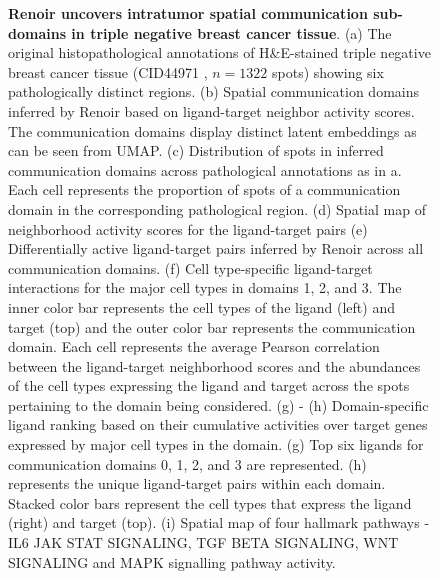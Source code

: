 \begin{figure}[H]
    \centering
    \caption{\textbf{Renoir uncovers intratumor spatial communication sub-domains in triple negative breast cancer tissue}. (a) The original histopathological annotations of H\&E-stained triple negative breast cancer tissue (CID44971 \citep{Wu2021}, $n=1322$ spots) showing six pathologically distinct regions. (b) Spatial communication domains inferred by Renoir based on ligand-target neighbor activity scores. The communication domains display distinct latent embeddings as can be seen from UMAP. (c) Distribution of spots in inferred communication domains across pathological annotations as in a. Each cell represents the proportion of spots of a communication domain in the corresponding pathological region. (d) Spatial map of neighborhood activity scores for the ligand-target pairs (e) Differentially active ligand-target pairs inferred by Renoir across all communication domains. (f) Cell type-specific ligand-target interactions for the major cell types in domains 1, 2, and 3. The inner color bar represents the cell types of the ligand (left) and target (top) and the outer color bar represents the communication domain. Each cell represents the average Pearson correlation between the ligand-target neighborhood scores and the abundances of the cell types expressing the ligand and target across the spots pertaining to the domain being considered. (g) - (h) Domain-specific ligand ranking based on their cumulative activities over target genes expressed by major cell types in the domain. (g) Top six ligands for communication domains 0, 1, 2, and 3 are represented. (h) represents the unique ligand-target pairs within each domain. Stacked color bars represent the cell types that express the ligand (right) and target (top). (i) Spatial map of four hallmark pathways - IL6 JAK STAT SIGNALING, TGF BETA SIGNALING, WNT SIGNALING and MAPK signalling pathway activity.}
\label{Fig BC}
\end{figure}

